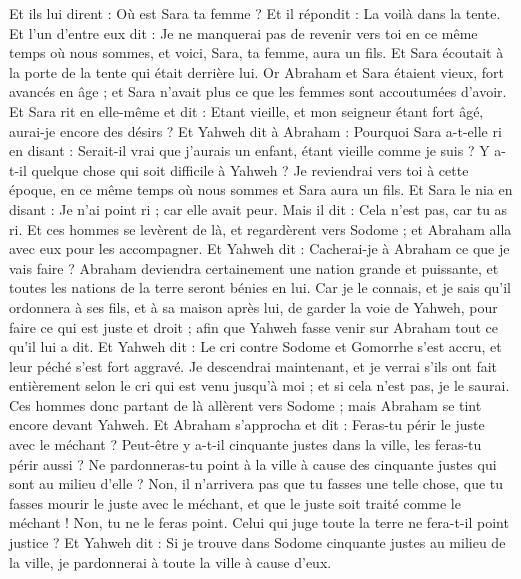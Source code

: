 \begin{multicols}{2}
Et ils lui dirent : Où est Sara ta femme ? Et il répondit : La voilà dans la tente.
Et l'un d'entre eux dit : Je ne manquerai pas de revenir vers toi en ce même temps où nous sommes, et voici, Sara, ta femme, aura un fils. Et Sara écoutait à la porte de la tente qui était derrière lui.
Or Abraham et Sara étaient vieux, fort avancés en âge ; et Sara n'avait plus ce que les femmes sont accoutumées d'avoir.
Et Sara rit en elle-même et dit : Etant vieille, et mon seigneur étant fort âgé, aurai-je encore des désirs ?
Et Yahweh dit à Abraham : Pourquoi Sara a-t-elle ri en disant : Serait-il vrai que j'aurais un enfant, étant vieille comme je suis ?
Y a-t-il quelque chose qui soit difficile à Yahweh ? Je reviendrai vers toi à cette époque, en ce même temps où nous sommes et Sara aura un fils.
Et Sara le nia en disant : Je n'ai point ri ; car elle avait peur. Mais il dit : Cela n'est pas, car tu as ri.
Et ces hommes se levèrent de là, et regardèrent vers Sodome ; et Abraham alla avec eux pour les accompagner.
Et Yahweh dit : Cacherai-je à Abraham ce que je vais faire ?
Abraham deviendra certainement une nation grande et puissante, et toutes les nations de la terre seront bénies en lui.
Car je le connais, et je sais qu'il ordonnera à ses fils, et à sa maison après lui, de garder la voie de Yahweh, pour faire ce qui est juste et droit ; afin que Yahweh fasse venir sur Abraham tout ce qu'il lui a dit.
Et Yahweh dit : Le cri contre Sodome et Gomorrhe s'est accru, et leur péché s'est fort aggravé.
Je descendrai maintenant, et je verrai s'ils ont fait entièrement selon le cri qui est venu jusqu'à moi ; et si cela n'est pas, je le saurai.
Ces hommes donc partant de là allèrent vers Sodome ; mais Abraham se tint encore devant Yahweh.
Et Abraham s'approcha et dit : Feras-tu périr le juste avec le méchant ?
Peut-être y a-t-il cinquante justes dans la ville, les feras-tu périr aussi ? Ne pardonneras-tu point à la ville à cause des cinquante justes qui sont au milieu d'elle ?
Non, il n'arrivera pas que tu fasses une telle chose, que tu fasses mourir le juste avec le méchant, et que le juste soit traité comme le méchant ! Non, tu ne le feras point. Celui qui juge toute la terre ne fera-t-il point justice ?
Et Yahweh dit : Si je trouve dans Sodome cinquante justes au milieu de la ville, je pardonnerai à toute la ville à cause d'eux.

\end{multicols}
